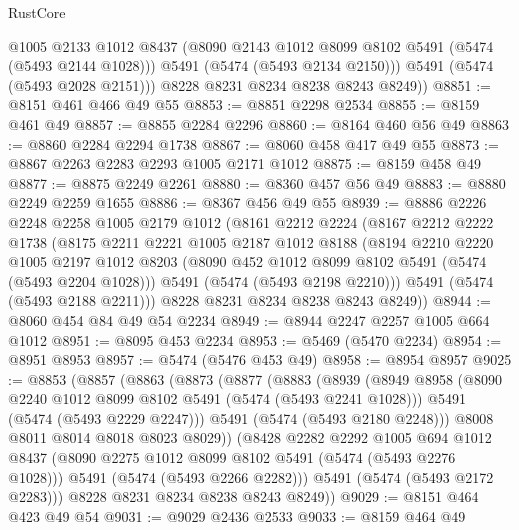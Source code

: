\begin{lexlean}{RustCore}
\begin{coremodule}
            @1005
            @2133
            @1012
            @8437
            (@8090 @2143 @1012 @8099 @8102 @5491 (@5474 (@5493 @2144 @1028)))
            @5491
            (@5474 (@5493 @2134 @2150)))
          @5491
          (@5474 (@5493 @2028 @2151)))
        @8228
        @8231
        @8234
        @8238
        @8243
        @8249))
@8851 := @8151 @461 @466 @49 @55
@8853 := @8851 @2298 @2534
@8855 := @8159 @461 @49
@8857 := @8855 @2284 @2296
@8860 := @8164 @460 @56 @49
@8863 := @8860 @2284 @2294 @1738
@8867 := @8060 @458 @417 @49 @55
@8873 := @8867 @2263 @2283 @2293 @1005 @2171 @1012
@8875 := @8159 @458 @49
@8877 := @8875 @2249 @2261
@8880 := @8360 @457 @56 @49
@8883 := @8880 @2249 @2259 @1655
@8886 := @8367 @456 @49 @55
@8939 := @8886
    @2226
    @2248
    @2258
    @1005
    @2179
    @1012
    (@8161
      @2212
      @2224
      (@8167
        @2212
        @2222
        @1738
        (@8175
          @2211
          @2221
          @1005
          @2187
          @1012
          @8188
          (@8194
            @2210
            @2220
            @1005
            @2197
            @1012
            @8203
            (@8090 @452 @1012 @8099 @8102 @5491 (@5474 (@5493 @2204 @1028)))
            @5491
            (@5474 (@5493 @2198 @2210)))
          @5491
          (@5474 (@5493 @2188 @2211)))
        @8228
        @8231
        @8234
        @8238
        @8243
        @8249))
@8944 := @8060 @454 @84 @49 @54 @2234
@8949 := @8944 @2247 @2257 @1005 @664 @1012
@8951 := @8095 @453 @2234
@8953 := @5469 (@5470 @2234)
@8954 := @8951 @8953
@8957 := @5474 (@5476 @453 @49)
@8958 := @8954 @8957
@9025 := @8853
    (@8857
      (@8863
        (@8873
          (@8877
            (@8883
              (@8939
                (@8949
                  @8958
                  (@8090 @2240 @1012 @8099 @8102 @5491 (@5474 (@5493 @2241 @1028)))
                  @5491
                  (@5474 (@5493 @2229 @2247)))
                @5491
                (@5474 (@5493 @2180 @2248)))
              @8008
              @8011
              @8014
              @8018
              @8023
              @8029))
          (@8428
            @2282
            @2292
            @1005
            @694
            @1012
            @8437
            (@8090 @2275 @1012 @8099 @8102 @5491 (@5474 (@5493 @2276 @1028)))
            @5491
            (@5474 (@5493 @2266 @2282)))
          @5491
          (@5474 (@5493 @2172 @2283)))
        @8228
        @8231
        @8234
        @8238
        @8243
        @8249))
@9029 := @8151 @464 @423 @49 @54
@9031 := @9029 @2436 @2533
@9033 := @8159 @464 @49

\end{coremodule}
\end{lexlean}
